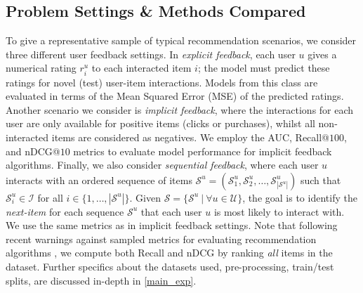 \subsection{Problem Settings \& Methods Compared} \label{feedback_types} \label{algorithms}
To give a representative sample of typical recommendation scenarios, we consider three different user feedback settings. In \emph{explicit feedback}, each user $u$ gives a numerical rating $r^u_i$ to each interacted item $i$; the model must predict these ratings for novel (test) user-item interactions. Models from this class are evaluated in terms of the Mean Squared Error (MSE) of the predicted ratings. Another scenario we consider is \emph{implicit feedback}, where the interactions for each user are only available for positive items (\eg clicks or purchases), whilst all non-interacted items are considered as negatives. We employ the AUC, Recall@$100$, and nDCG@$10$ metrics to evaluate model performance for implicit feedback algorithms. Finally, we also consider \emph{sequential feedback}, where each user $u$ interacts with an ordered sequence of items $\mathcal{S}^u = (\mathcal{S}^u_1, \mathcal{S}^u_2, \ldots, \mathcal{S}^u_{|\mathcal{S}^u|})$ such that $\mathcal{S}^u_i \in \mathcal{I}$ for all $i \in \{1, \ldots, |\mathcal{S}^u|\}$. Given $\mathcal{S} = \{ \mathcal{S}^u ~|~ \forall u \in \mathcal{U} \}$, the goal is to identify the \emph{next-item} for each sequence $\mathcal{S}^u$ that each user $u$ is most likely to interact with. We use the same metrics as in implicit feedback settings. Note that following recent warnings against sampled metrics for evaluating recommendation algorithms \cite{sampled_metrics, castells_sampling}, we compute both Recall and nDCG by ranking \emph{all} items in the dataset. Further specifics about the datasets used, pre-processing, train/test splits, \etc are discussed in-depth in \cref{main_exp}. 

